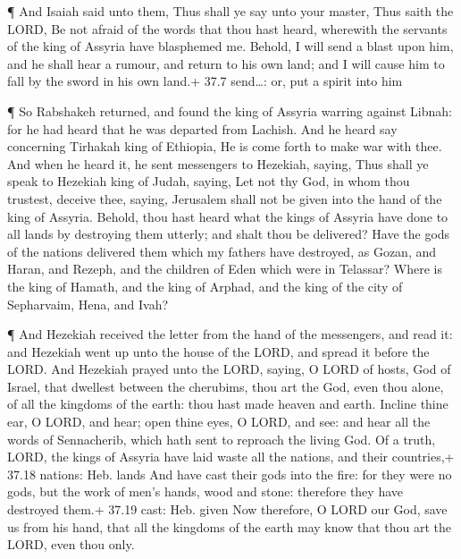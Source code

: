  ¶ And Isaiah said unto them, Thus shall ye say unto your
master, Thus saith the LORD, Be not afraid of the words that thou hast
heard, wherewith the servants of the king of Assyria have blasphemed me.
 Behold, I will send a blast upon him, and he shall hear a
rumour, and return to his own land; and I will cause him to fall by the
sword in his own land.+ 37.7 send\ldots: or, put a spirit into him

 ¶ So Rabshakeh returned, and found the king of Assyria
warring against Libnah: for he had heard that he was departed from
Lachish.  And he heard say concerning Tirhakah king of
Ethiopia, He is come forth to make war with thee. And when he heard it,
he sent messengers to Hezekiah, saying,  Thus shall ye
speak to Hezekiah king of Judah, saying, Let not thy God, in whom thou
trustest, deceive thee, saying, Jerusalem shall not be given into the
hand of the king of Assyria.  Behold, thou hast heard what
the kings of Assyria have done to all lands by destroying them utterly;
and shalt thou be delivered?  Have the gods of the nations
delivered them which my fathers have destroyed, as Gozan, and Haran, and
Rezeph, and the children of Eden which were in Telassar? 
Where is the king of Hamath, and the king of Arphad, and the king of the
city of Sepharvaim, Hena, and Ivah?

 ¶ And Hezekiah received the letter from the hand of the
messengers, and read it: and Hezekiah went up unto the house of the
LORD, and spread it before the LORD.  And Hezekiah prayed
unto the LORD, saying,  O LORD of hosts, God of Israel,
that dwellest between the cherubims, thou art the God, even thou alone,
of all the kingdoms of the earth: thou hast made heaven and earth.
 Incline thine ear, O LORD, and hear; open thine eyes, O
LORD, and see: and hear all the words of Sennacherib, which hath sent to
reproach the living God.  Of a truth, LORD, the kings of
Assyria have laid waste all the nations, and their countries,+ 37.18
nations: Heb. lands  And have cast their gods into the
fire: for they were no gods, but the work of men's hands, wood and
stone: therefore they have destroyed them.+ 37.19 cast: Heb. given
 Now therefore, O LORD our God, save us from his hand, that
all the kingdoms of the earth may know that thou art the LORD, even thou
only.

